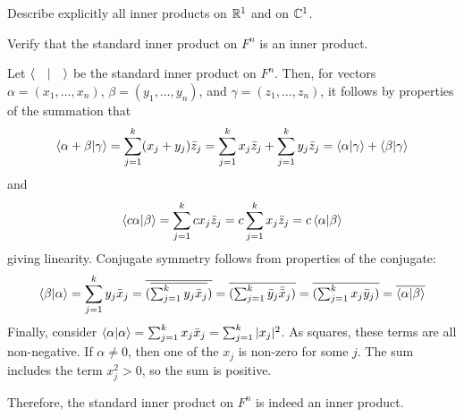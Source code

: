 \documentclass[notes]{agony}
\begin{document}
\begin{xca}
  Describe explicitly all inner products on $\mathbb{R}^1$ and on $\mathbb{C}^1$.
\end{xca}

\begin{xca}
  Verify that the standard inner product on $F^n$ is an inner product.
\end{xca}
\begin{prf}
  Let $\ip{\quad}$ be the standard inner product on $F^n$.
  Then, for vectors $\alpha = (x_1,\dotsc,x_n)$,
  $\beta = (y_1,\dotsc,y_n)$, and $\gamma = (z_1,\dotsc,z_n)$,
  it follows by properties of the summation that
  \[
    \ip{\alpha+\beta}{\gamma} = \sum_{j=1}^k (x_j+y_j)\bar z_j
    = \sum_{j=1}^k x_j \bar z_j + \sum_{j=1}^k y_j \bar z_j
    = \ip{\alpha}{\gamma} + \ip{\beta}{\gamma}
  \]
  and
  \[
    \ip{c\alpha}{\beta} = \sum_{j=1}^k cx_j\bar z_j
    = c\sum_{j=1}^k x_j \bar z_j
    = c\ip{\alpha}{\beta}
  \]
  giving linearity. Conjugate symmetry follows from properties of the conjugate:
  \[
    \ip{\beta}{\alpha} = \sum_{j=1}^k y_j \bar x_j
    = \overline{(\overline{\textstyle\sum_{j=1}^k y_j \bar x_j})}
    = \overline{(\textstyle\sum_{j=1}^k \bar y_j \bar{\bar{x}}_j)}
    = \overline{(\textstyle\sum_{j=1}^k x_j \bar y_j)}
    = \overline{\ip{\alpha}{\beta}}
  \]
  Finally, consider $\ip{\alpha} = \sum_{j=1}^k x_j \bar x_j = \sum_{j=1}^k |x_j|^2$.
  As squares, these terms are all non-negative.
  If $\alpha \neq 0$, then one of the $x_j$ is non-zero for some $j$.
  The sum includes the term $x_j^2 > 0$, so the sum is positive.

  Therefore, the standard inner product on $F^n$ is indeed an inner product.
\end{prf}
\end{document}
